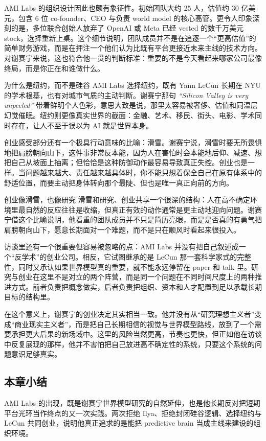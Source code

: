 AMI Labs 的组织设计因此也颇有象征性。初始团队大约 25 人，估值约 30 亿美元，包含 6 位 co-founder、CEO 与负责 world model 的核心高管。更令人印象深刻的是，多位联合创始人放弃了 OpenAI 或 Meta 已经 vested 的数千万美元 stock，选择重新上桌。这个细节说明，团队成员并不是在追逐一个“更高估值”的简单财务游戏，而是在押注一个他们认为比既有平台更接近未来主线的技术方向。对谢赛宁来说，这也符合他一贯的判断标准：重要的不是今天看起来哪家公司最像终局，而是你正在和谁做什么。

\begin{knowledgebox}{为什么是纽约，而不是硅谷}
AMI Labs 选择纽约，既有 Yann LeCun 长期在 NYU 的学术根基，也有对城市气质的主动判断。谢赛宁那句 \textit{``Silicon Valley is very unpeeled''} 带着鲜明个人色彩，意思大致是说，那里太容易被奢侈、估值和同温层幻觉催眠。纽约则更像真实世界的截面：金融、艺术、移民、街头、电影、学术同时存在，让人不至于误以为 AI 就是世界本身。
\end{knowledgebox}

创业感受部分还有一个极具行动意味的比喻：滑雪。谢赛宁说，滑雪时要无所畏惧地把肩膀朝向山下，这件事非常反本能，因为人在害怕时会本能地后仰、减速、想把自己从坡面上抽离；但恰恰是这种防御动作最容易导致真正失控。创业也是一样。当问题越来越大、责任越来越具体时，你不能只想着保全自己在原有体系中的舒适位置，而要主动把身体转向那个最陡、但也是唯一真正向前的方向。

\begin{importantbox}{创业像滑雪，也像研究}
滑雪和研究、创业共享一个很深的结构：人在高不确定环境里最自然的反应往往是收缩，但真正有效的动作通常是更主动地迎向问题。谢赛宁借这个比喻说明，他看重的团队成员并不只是简历亮眼，而是是否真的有勇气把肩膀朝向山下，愿意长期面对一个难题，而不是只在顺风时看起来很投入。
\end{importantbox}

访谈里还有一个很重要但容易被忽略的点：AMI Labs 并没有把自己叙述成一个“反学术”的创业公司。相反，它试图继承的是 LeCun 那一套科学家式的完整性，同时又承认如果世界模型真的重要，就不能永远停留在 paper 和 talk 里。研究与创业在这里不是对立的两个阵营，而是同一个问题在不同时间尺度上的两种推进方式。前者负责把概念做实，后者负责把组织、资本和人才配置到足以承载长期目标的结构里。

在这个意义上，谢赛宁的创业决定其实相当一致。他并没有从“研究理想主义者”变成“商业现实主义者”，而是把自己长期相信的视觉与世界模型路线，放到了一个需要承担更大后果的新场域中。这里的风险当然更高，节奏也更快，但正如他在访谈中反复展现的那样，他并不害怕把自己放进高不确定性的系统，只要这个系统的问题意识足够真实。

\subsection{本章小结}

AMI Labs 的出现，既是谢赛宁世界模型研究的自然延伸，也是他长期反对把短期平台光环当作终点的又一次实践。两次拒绝 Ilya、拒绝封闭硅谷逻辑、选择纽约与 LeCun 共同创业，说明他真正追求的是能把 predictive brain 当成主线来建设的组织环境。

